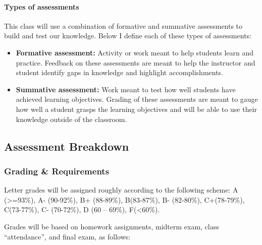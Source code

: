 \documentclass[
  letterpaper,
  DIV=11,
  numbers=noendperiod]{scrartcl}
\let\oldparagraph\paragraph
\renewcommand{\paragraph}[1]{\oldparagraph{#1}\mbox{}}
\begin{document}
\hypertarget{types-of-assessments}{%
\paragraph{Types of assessments}\label{types-of-assessments}}

This class will use a combination of formative and summative assessments
to build and test our knowledge. Below I define each of these types of
assessments:

\begin{itemize}
\item
  \textbf{Formative assessment:} Activity or work meant to help students
  learn and practice. Feedback on these assessments are meant to help
  the instructor and student identify gaps in knowledge and highlight
  accomplishments.
\item
  \textbf{Summative assessment:} Work meant to test how well students
  have achieved learning objectives. Grading of these assessments are
  meant to gauge how well a student grasps the learning objectives and
  will be able to use their knowledge outside of the classroom.
\end{itemize}

\hypertarget{assessment-breakdown}{%
\subsection{Assessment Breakdown}\label{assessment-breakdown}}

\hypertarget{grading-requirements}{%
\subsubsection{Grading \& Requirements}\label{grading-requirements}}

Letter grades will be assigned roughly according to the following
scheme: A (\textgreater=93\%), A- (90-92\%), B+ (88-89\%), B(83-87\%),
B- (82-80\%), C+(78-79\%), C(73-77\%), C- (70-72\%), D (60 -- 69\%),
F(\textless60\%).

Grades will be based on homework assignments, midterm exam, class
``attendance'', and final exam, as follows:
\end{document}
